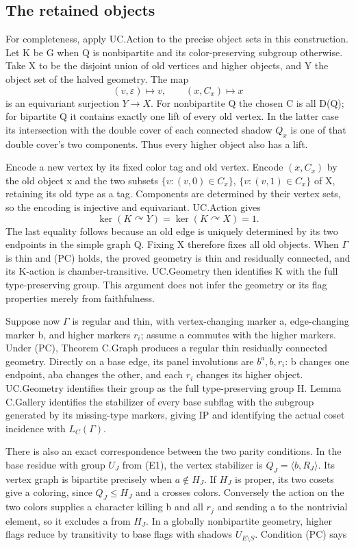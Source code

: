 \subsection{The retained objects}\label{the-retained-objects}

For completeness, apply UC.Action to the precise object sets in this
construction. Let K be G when Q is nonbipartite and its color-preserving
subgroup otherwise. Take X to be the disjoint union of old vertices and
higher objects, and Y the object set of the halved geometry. The map \[
(v,\varepsilon)\mapsto v,\qquad (x,C_x)\mapsto x
\tag{C4}
\] is an equivariant surjection \(Y\to X\). For nonbipartite Q the
chosen C is all D(Q); for bipartite Q it contains exactly one lift of
every old vertex. In the latter case its intersection with the double
cover of each connected shadow \(Q_x\) is one of that double cover's two
components. Thus every higher object also has a lift.

Encode a new vertex by its fixed color tag and old vertex. Encode
\((x,C_x)\) by the old object x and the two subsets
\(\{v:(v,0)\in C_x\}\), \(\{v:(v,1)\in C_x\}\) of X, retaining its old
type as a tag. Components are determined by their vertex sets, so the
encoding is injective and equivariant. UC.Action gives \[
\ker(K\curvearrowright Y)=\ker(K\curvearrowright X)=1.
\tag{C5}
\] The last equality follows because an old edge is uniquely determined
by its two endpoints in the simple graph Q. Fixing X therefore fixes all
old objects. When \(\Gamma\) is thin and (PC) holds, the proved geometry
is thin and residually connected, and its K-action is
chamber-transitive. UC.Geometry then identifies K with the full
type-preserving group. This argument does not infer the geometry or its
flag properties merely from faithfulness.

Suppose now \(\Gamma\) is regular and thin, with vertex-changing marker
a, edge-changing marker b, and higher markers \(r_i\); assume a commutes
with the higher markers. Under (PC), Theorem C.Graph produces a regular
thin residually connected geometry. Directly on a base edge, its panel
involutions are \(b^a,b,r_i\): b changes one endpoint, aba changes the
other, and each \(r_i\) changes its higher object. UC.Geometry
identifies their group as the full type-preserving group H. Lemma
C.Gallery identifies the stabilizer of every base subflag with the
subgroup generated by its missing-type markers, giving IP and
identifying the actual coset incidence with \(L_C(\Gamma )\).

There is also an exact correspondence between the two parity conditions.
In the base residue with group \(U_J\) from (E1), the vertex stabilizer
is \(Q_J=\langle b,R_J\rangle\). Its vertex graph is bipartite precisely
when \(a\notin H_J\). If \(H_J\) is proper, its two cosets give a
coloring, since \(Q_J\le H_J\) and a crosses colors. Conversely the
action on the two colors supplies a character killing b and all \(r_j\)
and sending a to the nontrivial element, so it excludes a from \(H_J\).
In a globally nonbipartite geometry, higher flags reduce by transitivity
to base flags with shadows \(U_{E\setminus S}\). Condition (PC) says

